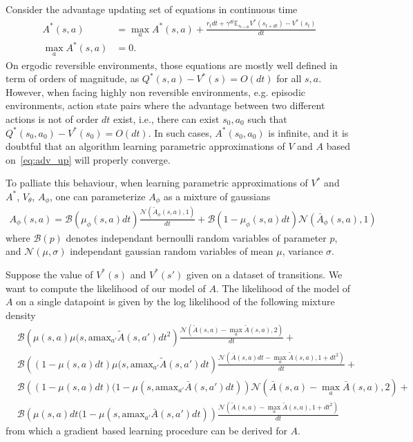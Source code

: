 \documentclass[11pt]{article}
\newcommand{\E}{\mathbb{E}}
\newcommand{\bern}[1]{\mathcal{B}\left(#1\right)}
\newcommand{\gauss}[1]{\mathcal{N}\left(#1\right)}
\newcommand{\argmax}{\text{amax}}
\newcommand{\bigO}{O}
\begin{document}
Consider the advantage updating set of equations in continuous time
\begin{align}
	A^*(s, a) &= \max_a A^*(s,a) + \frac{r_t dt + \gamma^{dt} \E_{s_{t+dt}} V^*(s_{t+dt}) - V^*(s_t)}{dt}\\
	\max_a A^*(s, a) &= 0.
	\label{eq:adv_up}
\end{align}
On ergodic reversible environments, those equations are mostly well defined in
term of orders of magnitude, as $Q^*(s,a) - V^*(s) = \bigO(dt)$ for all $s, a$.
However, when facing highly non reversible environments, e.g. episodic
environments, action state pairs where the advantage between two different actions
is not of order $dt$ exist, i.e., there can exist $s_0, a_0$ such that
$Q^*(s_0, a_0) - V^*(s_0) = \bigO(dt)$. In such cases, $A^*(s_0, a_0)$ is infinite,
and it is doubtful that an algorithm learning parametric approximations of
$V$ and $A$ based on~\eqref{eq:adv_up} will properly converge.

To palliate this behaviour, when learning parametric approximations of $V^*$ and $A^*$,
$V_\theta$, $A_\phi$, one can parameterize $A_\phi$ as a mixture of gaussians
\begin{align}
	A_\phi(s, a) = \bern{\mu_\phi(s, a)dt} \frac{\gauss{\tilde{A}_\phi(s, a), 1}}{dt} + \bern{1 - \mu_\phi(s, a)dt} \gauss{\bar{A}_\phi(s, a), 1}
\end{align}
where $\bern{p}$ denotes independant bernoulli random variables of parameter $p$, and
$\gauss{\mu, \sigma}$ independant gaussian random variables of mean $\mu$, variance
$\sigma$.

Suppose the value of $V^*(s)$ and $V^*(s')$ given on a dataset of transitions.
We want to compute the likelihood of our model of $A$.
The likelihood of the model of $A$ on a single datapoint is given by the log likelihood
of the following mixture density
\begin{align}
	&\bern{\mu(s, a)\mu(s, \argmax_{a'} \tilde{A}(s, a')dt^2} \frac{\gauss{\tilde{A}(s, a) - \max_a \tilde{A}(s, a), 2}}{dt} + \nonumber\\
	&\bern{(1 - \mu(s, a)dt)\mu(s, \argmax_{a'} \tilde{A}(s, a')dt} \frac{\gauss{\bar{A}(s, a)dt - \max_a \tilde{A}(s, a), 1 + dt^2}}{dt} + \nonumber\\
	&\bern{(1 - \mu(s, a)dt)(1 - \mu(s, \argmax_{a'} \bar{A}(s, a')dt)} \gauss{\bar{A}(s, a) - \max_a \bar{A}(s, a), 2} + \nonumber\\
	&\bern{\mu(s, a)dt(1 - \mu(s, \argmax_{a'} \bar{A}(s, a')dt)} \frac{\gauss{\tilde{A}(s, a) - \max_a \tilde{A}(s, a), 1 + dt^2}}{dt}
\end{align}
from which a gradient based learning procedure can be derived for $A$.
\end{document}
